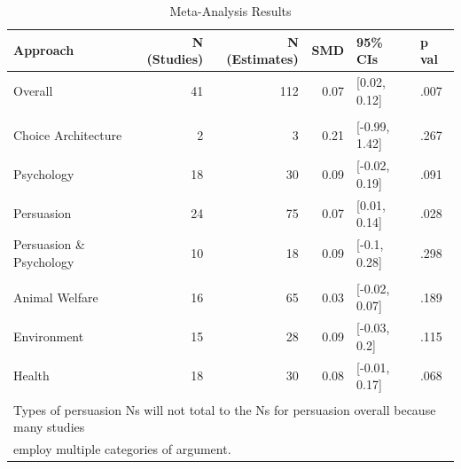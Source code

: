 \documentclass[sn-nature,referee,pdflatex]{sn-jnl}
\begin{document}
\begin{table}[!h]
\centering
\caption{\label{tab:table_one}Meta-Analysis Results}
\centering
\begin{tabular}[t]{lrrrll}
\toprule
Approach & N (Studies) & N (Estimates) & SMD & 95\% CIs & p val\\
\midrule
Overall & 41 & 112 & 0.07 & {}[0.02, 0.12] & .007\\
\addlinespace[0.5em]
\multicolumn{6}{l}{\textbf{Theory}}\\
\hspace{1em}Choice Architecture & 2 & 3 & 0.21 & {}[-0.99, 1.42] & .267\\
\hspace{1em}Psychology & 18 & 30 & 0.09 & {}[-0.02, 0.19] & .091\\
\hspace{1em}Persuasion & 24 & 75 & 0.07 & {}[0.01, 0.14] & .028\\
\hspace{1em}Persuasion \& Psychology & 10 & 18 & 0.09 & {}[-0.1, 0.28] & .298\\
\addlinespace[0.5em]
\multicolumn{6}{l}{\textbf{Type of Persuasion}}\\
\hspace{1em}Animal Welfare & 16 & 65 & 0.03 & {}[-0.02, 0.07] & .189\\
\hspace{1em}Environment & 15 & 28 & 0.09 & {}[-0.03, 0.2] & .115\\
\hspace{1em}Health & 18 & 30 & 0.08 & {}[-0.01, 0.17] & .068\\
\bottomrule
\multicolumn{6}{l}{\textsuperscript{} Types of persuasion Ns will not total to the Ns for persuasion overall because many studies}\\
\multicolumn{6}{l}{employ multiple categories of argument.}\\
\end{tabular}
\end{table}
\end{document}
